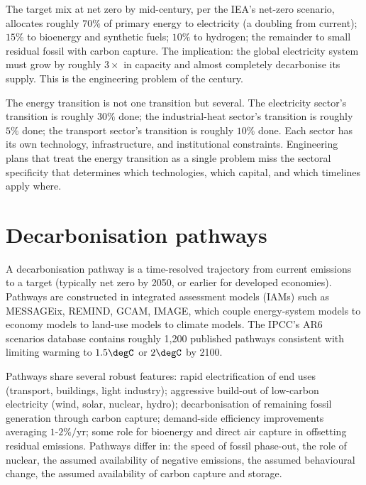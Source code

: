 The target mix at net zero by mid-century, per the IEA's net-zero scenario, allocates roughly $70\%$ of primary energy to electricity (a doubling from current); $15\%$ to bioenergy and synthetic fuels; $10\%$ to hydrogen; the remainder to small residual fossil with carbon capture. The implication: the global electricity system must grow by roughly $3\times$ in capacity and almost completely decarbonise its supply. This is the engineering problem of the century.

\begin{principle}
The energy transition is not one transition but several. The electricity sector's transition is roughly $30\%$ done; the industrial-heat sector's transition is roughly $5\%$ done; the transport sector's transition is roughly $10\%$ done. Each sector has its own technology, infrastructure, and institutional constraints. Engineering plans that treat the energy transition as a single problem miss the sectoral specificity that determines which technologies, which capital, and which timelines apply where.
\end{principle}

\section{Decarbonisation pathways}

A decarbonisation pathway is a time-resolved trajectory from current emissions to a target (typically net zero by 2050, or earlier for developed economies). Pathways are constructed in integrated assessment models (IAMs) such as MESSAGEix, REMIND, GCAM, IMAGE, which couple energy-system models to economy models to land-use models to climate models. The IPCC's AR6 scenarios database \cite{std:ipcc-ar6-wg3-2022} contains roughly 1,200 published pathways consistent with limiting warming to $1.5\degC$ or $2\degC$ by 2100.

Pathways share several robust features: rapid electrification of end uses (transport, buildings, light industry); aggressive build-out of low-carbon electricity (wind, solar, nuclear, hydro); decarbonisation of remaining fossil generation through carbon capture; demand-side efficiency improvements averaging $1$-$2\%/\text{yr}$; some role for bioenergy and direct air capture in offsetting residual emissions. Pathways differ in: the speed of fossil phase-out, the role of nuclear, the assumed availability of negative emissions, the assumed behavioural change, the assumed availability of carbon capture and storage.

